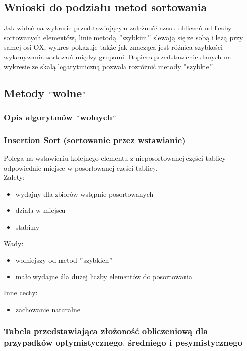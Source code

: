 \documentclass[polish,polish,a4paper]{article}
\begin{document}
\begin{spacing}{1.5}
	\subsection*{Wnioski do podziału metod sortowania}
	
	Jak widać na wykresie przedstawiającym zależność czasu obliczeń od liczby sortowanych elementów, linie metodą  $ " $szybkim$ " $ zlewają się ze sobą i leżą przy samej osi OX, wykres pokazuje także jak znacząca jest różnica szybkości wykonywania sortowań między grupami. Dopiero przedstawienie danych na wykresie ze skalą logarytmiczną pozwala rozróżnić metody $"$szybkie$"$.
	
	\subsection{Metody $ "$wolne$" $}
	\subsubsection{Opis algorytmów $"$wolnych$"$}
	\subsubsection*{Insertion Sort (sortowanie przez wstawianie)}
	Polega na wstawieniu kolejnego elementu z nieposortowanej części tablicy odpowiednie miejsce w posortowanej części tablicy.\\
	
	Zalety:
	\begin{itemize}
		\item wydajny dla zbiorów wstępnie posortowanych
		\item działa w miejscu
		\item stabilny 
	\end{itemize}
	Wady:
	\begin{itemize}
		\item wolniejszy od metod $ " $szybkich$ " $
		\item mało wydajne dla dużej liczby elementów do posortowania
	\end{itemize}
	Inne cechy:
	\begin{itemize}
		\item zachowanie naturalne
	\end{itemize}
	
				\subsubsection*{Tabela przedstawiająca złożoność obliczeniową dla przypadków optymistycznego, średniego i pesymistycznego} 
	

\end{spacing}
\end{document}
